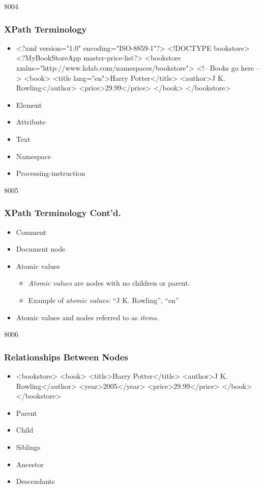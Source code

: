 \begin{slide}[fragile]{8004}
\frametitle{XPath Terminology}
\begin{itemize}
\item[] 
\begin{xml}
<?xml version="1.0" encoding="ISO-8859-1"?>
<!DOCTYPE bookstore>
<?MyBookStoreApp master-price-list?>
<bookstore xmlns="http://www.kdab.com/namespaces/bookstore">
    <!-- Books go here -->
    <book>
        <title lang="en">Harry Potter</title>
        <author>J K. Rowling</author>
        <price>29.99</price>
    </book>
</bookstore>
\end{xml}
\vspace{4pt}
 \item Element
 \item Attribute
 \item Text
 \item Namespace
 \item Processing-instruction
\end{itemize}
\end{slide}


\begin{slide}{8005}
\frametitle{XPath Terminology Cont'd.}
\begin{itemize}

\item Comment
\item Document node
\item Atomic values
\begin{itemize}
 \item \emph{Atomic values} are nodes with no children or parent.
 \item Example of \emph{atomic values:} ``J K. Rowling'', ``en''
\end{itemize}

\item Atomic values and nodes referred to as \emph{items}.
\end{itemize}
\end{slide}


\begin{slide}[fragile]{8006}
\frametitle{Relationships Between Nodes}
\begin{itemize}
\item[]
\begin{xml}
<bookstore>
  <book>
    <title>Harry Potter</title>
    <author>J K. Rowling</author>
    <year>2005</year>
    <price>29.99</price>
  </book>
</bookstore>
\end{xml}
\vspace{8pt}
\item Parent
\item Child
\item Siblings
\item Ancestor
\item Descendants
\end{itemize}
\end{slide}


